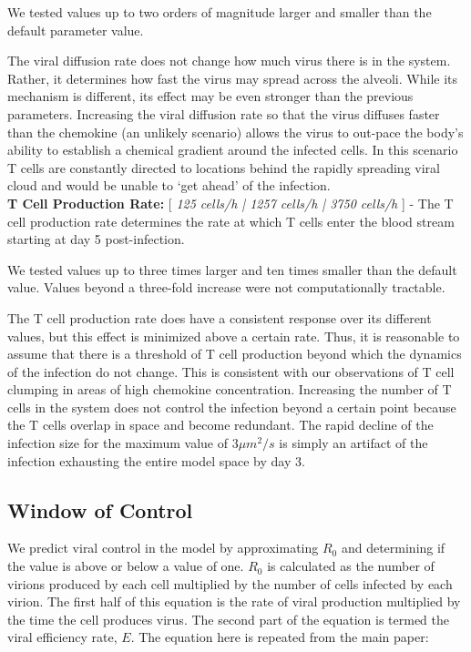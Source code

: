 \documentclass[10pt]{article}
\begin{document}
We tested values up to two orders of magnitude larger and smaller than the default parameter value.

The viral diffusion rate does not change how much virus there is in the system.  Rather, it determines how fast the virus may spread across the alveoli.  While its mechanism is different, its effect may be even stronger than the previous parameters.  Increasing the viral diffusion rate so that the virus diffuses faster than the chemokine (an unlikely scenario) allows the virus to out-pace the body's ability to establish a chemical gradient around the infected cells.  In this scenario T cells are constantly directed to locations behind the rapidly spreading viral cloud and would be unable to `get ahead' of the infection. \\


\textbf{T Cell Production Rate:} [ \textit{125 cells/h | 1257 cells/h | 3750 cells/h} ] - The T cell production rate determines the rate at which T cells enter the blood stream starting at day 5 post-infection.

We tested values up to three times larger and ten times smaller than the default value.  Values beyond a three-fold increase were not computationally tractable.

The T cell production rate does have a consistent response over its different values, but this effect is minimized above a certain rate.  Thus, it is reasonable to assume that there is a threshold of T cell production beyond which the dynamics of the infection do not change.  This is consistent with our observations of T cell clumping in areas of high chemokine concentration.  Increasing the number of T cells in the system does not control the infection beyond a certain point because the T cells overlap in space and become redundant.  The rapid decline of the infection size for the maximum value of $3 \mu m^2/s$ is simply an artifact of the infection exhausting the entire model space by day 3.


\subsection{Window of Control}

We predict viral control in the model by approximating $R_0$ and determining if the value is above or below a value of one.  $R_0$ is calculated as the number of virions produced by each cell multiplied by the number of cells infected by each virion.  The first half of this equation is the rate of viral production multiplied by the time the cell produces virus.  The second part of the equation is termed the viral efficiency rate, $E$.  The equation here is repeated from the main paper:
\end{document}
